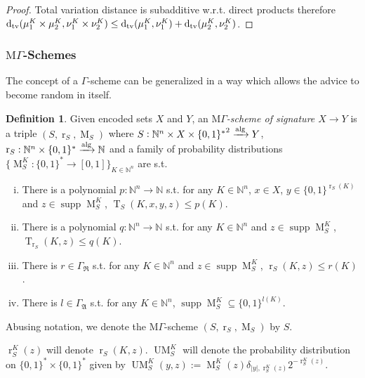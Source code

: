 \documentclass{article}
\numberwithin{equation}{section}
\theoremstyle{definition}
\newtheorem{definition}{Definition}[section]
\theoremstyle{plain}
\newcommand{\Bool}{\{0,1\}}
\newcommand{\Words}{{\Bool^*}}
\newcommand{\WordsLen}[1]{{\Bool^{#1}}}
\DeclareMathOperator{\Supp}{supp}
\DeclareMathOperator{\T}{T}
\DeclareMathOperator{\R}{r}
\DeclareMathOperator{\M}{M}
\DeclareMathOperator{\UM}{UM}
\newcommand{\Dtv}{\operatorname{d}_{\textnormal{tv}}}
\newcommand{\Nats}{\mathbb{N}}
\newcommand{\Abs}[1]{\lvert #1 \rvert}
\newcommand{\GrowR}{\Gamma_{\mathfrak{R}}}
\newcommand{\GrowA}{\Gamma_{\mathfrak{A}}}
\newcommand{\MGrow}{\mathrm{M}\Gamma}
\newcommand{\Alg}{\xrightarrow{\textnormal{alg}}}
\begin{document}
\begin{proof}

Total variation distance is subadditive w.r.t. direct products therefore $\Dtv(\mu_1^K \times \mu_2^K, \nu_1^K \times \nu_2^K) \leq \Dtv(\mu_1^K, \nu_1^K) + \Dtv(\mu_2^K, \nu_2^K)$.
\end{proof}

\subsubsection{\texorpdfstring{$\MGrow$}{MΓ}-Schemes}

The concept of a $\Gamma$-scheme can be generalized in a way which allows the advice to become random in itself.

\begin{samepage}
\begin{definition}

Given encoded sets $X$ and $Y$, an \emph{$\MGrow$-scheme of signature ${X \rightarrow Y}$} is a triple $(S,\R_S,\M_S)$ where $S: \Nats^n \times X \times \Words^2 \Alg Y$, ${\R_S: \Nats^n \times \Words \Alg \Nats}$ and a family of probability distributions $\{\M_S^K: \Words \rightarrow [0,1]\}_{K \in \Nats^n}$ are s.t.

\begin{enumerate}[(i)]

\item There is a polynomial $p: \Nats^n \rightarrow \Nats$ s.t. for any $K \in \Nats^n$, $x \in X$, ${y \in \WordsLen{\R_S(K)}}$ and $z \in \Supp \M_S^K$, $\T_S(K,x,y,z) \leq p(K)$.

\item There is a polynomial $q: \Nats^n \rightarrow \Nats$ s.t. for any $K \in \Nats^n$ and $z \in \Supp \M_S^K$, ${\T_{\R_S}(K,z) \leq q(K)}$.

\item There is $r \in \GrowR$ s.t. for any $K \in \Nats^n$ and $z \in \Supp \M_S^K$, $\R_S(K,z) \leq r(K)$.

\item There is $l \in \GrowA$ s.t. for any $K \in \Nats^n$, $\Supp \M_S^K \subseteq \WordsLen{l(K)}$.

\end{enumerate}

Abusing notation, we denote the $\MGrow$-scheme $(S,\R_S,\M_S)$ by $S$.

$\R_S^K(z)$ will denote $\R_S(K,z)$. $\UM_S^K$ will denote the probability distribution on ${\Words \times \Words}$ given by $\UM_S^K(y,z):= \M_S^K(z) \delta_{\Abs{y},\R_S^K(z)} 2^{-\R_S^K(z)}$.


\end{definition}
\end{samepage}
\end{document}
